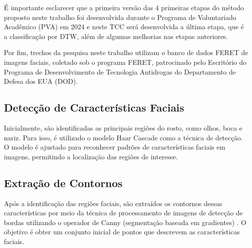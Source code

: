 É importante esclarecer que a primeira versão das 4 primeiras etapas do método proposto neste trabalho foi desenvolvida durante o Programa de Voluntariado Acadêmico (PVA) em 2024 e neste TCC será desenvolvida a última etapa, que é a classificação por DTW, além de algumas melhorias nas etapas anteriores.

Por fim, trechos da pesquisa neste trabalho utilizam o banco de dados FERET \cite{FERET1,FERET2} de imagens faciais, coletado sob o programa FERET, patrocinado pelo Escritório do Programa de Desenvolvimento de Tecnologia Antidrogas do Departamento de Defesa dos EUA (DOD).

\subsection{Detecção de Características Faciais}

Inicialmente, são identificadas as principais regiões do rosto, como olhos, boca e nariz. Para isso, é utilizado o modelo Haar Cascade \cite{BoostedCascade, HaarAplicacao} como a técnica de detecção. O modelo é ajustado para reconhecer padrões de características faciais em imagens, permitindo a localização das regiões de interesse.

\subsection{Extração de Contornos} 

Após a identificação das regiões faciais, são extraídos os contornos dessas características por meio da técnica de processamento de imagens de detecção de bordas utilizando o operador de Canny (segmentação baseada em gradientes) \cite{Canny,CannyAplicacao}. O objetivo é obter um conjunto inicial de pontos que descrevem as características faciais.




